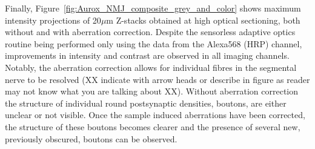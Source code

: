 Finally, Figure~\ref{fig:Aurox_NMJ_composite_grey_and_color} shows maximum 
intensity projections of 20$\mu$m Z-stacks obtained at high optical 
sectioning, both without and with aberration correction. Despite the 
sensorless adaptive optics routine being performed only using the data 
from the Alexa568 (HRP) channel, improvements in intensity and contrast
are observed in all imaging channels. Notably, the aberration correction 
allows for individual fibres in the segmental nerve to be resolved (XX
indicate with arrow heads or describe in figure as reader may not know what you are
talking about XX). Without
aberration correction the structure of individual round postsynaptic 
densities, boutons, are either unclear or not visible. Once the sample 
induced aberrations have been corrected, the structure of these boutons 
becomes clearer and the presence of several new, previously obscured, boutons 
can be observed.

